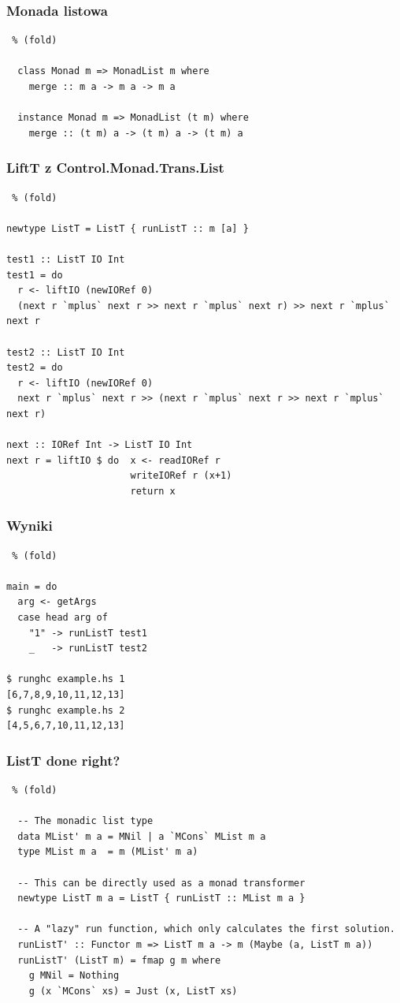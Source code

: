 \documentclass{beamer}
\begin{document}
\begin{frame}[fragile] %
  \frametitle{Monada listowa}
  \begin{lstlisting} % (fold)

  class Monad m => MonadList m where
    merge :: m a -> m a -> m a

  instance Monad m => MonadList (t m) where
    merge :: (t m) a -> (t m) a -> (t m) a

  \end{lstlisting}
\end{frame}

\begin{frame}[fragile] %
  \frametitle{LiftT z Control.Monad.Trans.List}
\begin{lstlisting} % (fold)

newtype ListT = ListT { runListT :: m [a] }

test1 :: ListT IO Int
test1 = do
  r <- liftIO (newIORef 0)
  (next r `mplus` next r >> next r `mplus` next r) >> next r `mplus` next r
 
test2 :: ListT IO Int
test2 = do
  r <- liftIO (newIORef 0)
  next r `mplus` next r >> (next r `mplus` next r >> next r `mplus` next r)
 
next :: IORef Int -> ListT IO Int
next r = liftIO $ do  x <- readIORef r
                      writeIORef r (x+1)
                      return x
\end{lstlisting}
\end{frame}

\begin{frame}[fragile] %
  \frametitle{Wyniki}
  \begin{lstlisting} % (fold)

main = do
  arg <- getArgs
  case head arg of 
    "1" -> runListT test1
    _   -> runListT test2

$ runghc example.hs 1
[6,7,8,9,10,11,12,13]
$ runghc example.hs 2
[4,5,6,7,10,11,12,13]

  \end{lstlisting}
\end{frame}

\begin{frame}[fragile] %
  \frametitle{ListT done right?}
  \begin{lstlisting} % (fold)

  -- The monadic list type
  data MList' m a = MNil | a `MCons` MList m a
  type MList m a  = m (MList' m a)
   
  -- This can be directly used as a monad transformer
  newtype ListT m a = ListT { runListT :: MList m a }
   
  -- A "lazy" run function, which only calculates the first solution.
  runListT' :: Functor m => ListT m a -> m (Maybe (a, ListT m a))
  runListT' (ListT m) = fmap g m where
    g MNil = Nothing
    g (x `MCons` xs) = Just (x, ListT xs)

  \end{lstlisting}
\end{frame}
\end{document}
